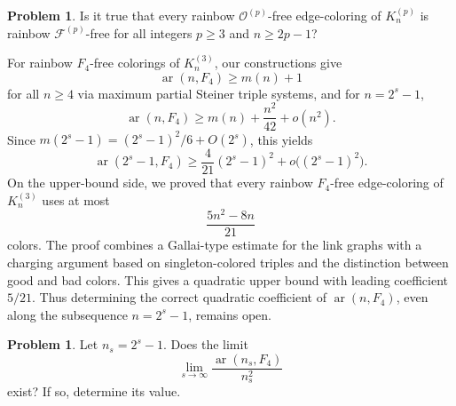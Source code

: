 \documentclass[10pt,a4paper]{article}
\theoremstyle{definition}
\newtheorem{problem}[theorem]{Problem}
\newcommand{\cF}{\mathcal{F}}
\newcommand{\cO}{\mathcal{O}}
\DeclareMathOperator{\ar}{ar}
\begin{document}
\begin{problem}\label{pb1}
Is it true that every rainbow $\cO^{(p)}$-free edge-coloring of $K_n^{(p)}$ is rainbow $\cF^{(p)}$-free for all integers $p\ge3$ and $n\ge2p-1$?
\end{problem}

For rainbow $F_4$-free colorings of $K_n^{(3)}$, our constructions give
\[
    \ar(n,F_4)\ge m(n)+1
\]
for all $n\ge4$ via maximum partial Steiner triple systems, and for $n=2^s-1$,
\[
    \ar(n,F_4)\ge m(n)+\frac{n^2}{42}+o(n^2).
\]
Since $m(2^s-1)=(2^s-1)^2/6+O(2^s)$, this yields
\[
    \ar(2^s-1,F_4)\ge \frac{4}{21}(2^s-1)^2+o\bigl((2^s-1)^2\bigr).
\]
On the upper-bound side, we proved that every rainbow \(F_4\)-free
edge-coloring of \(K_n^{(3)}\) uses at most
\[
    \frac{5n^2-8n}{21}
\]
colors. The proof combines a Gallai-type estimate for the link graphs
with a charging argument based on singleton-colored triples and the
distinction between good and bad colors. This gives a quadratic upper
bound with leading coefficient \(5/21\).
Thus determining the correct quadratic coefficient of \(\ar(n,F_4)\),
even along the subsequence \(n=2^s-1\), remains open.
\begin{problem}\label{pb:F4-projective-subsequence}
Let \(n_s=2^s-1\). Does the limit
\[
    \lim_{s\to\infty}\frac{\ar(n_s,F_4)}{n_s^2}
\]
exist? If so, determine its value.
\end{problem}
\end{document}
